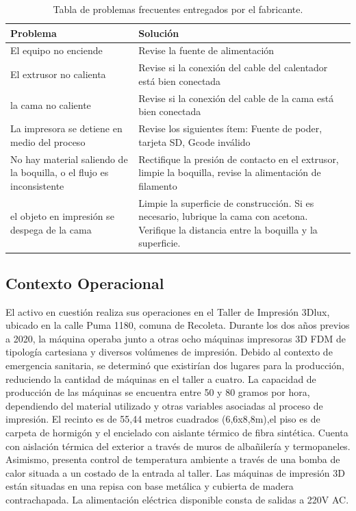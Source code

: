\begin{table}[H]
  \centering
 
    \begin{tabular}{|p{9.215em}|p{19.645em}|}
	\hline    
    Problema & \multicolumn{1}{l}{Solución} \\
	\hline    
    El equipo no enciende & Revise la fuente de alimentación \\
	\hline    
    El extrusor no calienta & Revise si la conexión del cable del calentador está bien conectada \\
	\hline    
    la cama no caliente & Revise si la conexión del cable de la cama está bien conectada \\
	\hline    
    La impresora se detiene en medio del proceso & Revise los siguientes ítem: Fuente de poder, tarjeta SD, Gcode inválido \\
	\hline    
    No hay material saliendo de la boquilla, o el flujo es inconsistente & Rectifique la presión de contacto en el extrusor, limpie la boquilla, revise la alimentación de filamento \\
	\hline    
    el objeto en impresión se despega de la cama & Limpie la superficie de construcción. Si es necesario, lubrique la cama con acetona. Verifique la distancia entre la boquilla y la superficie.  \\
	\hline    
    \end{tabular}%
     \caption{Tabla de problemas frecuentes entregados por el fabricante.}
  \label{tab:addlabel}%
\end{table}%


\subsection{Contexto Operacional}

El activo en cuestión realiza sus operaciones en el Taller de Impresión 3Dlux, ubicado en la calle Puma 1180, comuna de Recoleta. Durante los dos años previos a 2020, la máquina operaba junto a otras ocho máquinas impresoras 3D FDM de tipología cartesiana y diversos volúmenes de impresión. Debido al contexto de emergencia sanitaria, se determinó que existirían dos lugares para la producción, reduciendo la cantidad de máquinas en el taller a cuatro. La capacidad de producción de las máquinas se encuentra entre 50 y 80 gramos por hora, dependiendo del material utilizado y otras variables asociadas al proceso de impresión. El recinto es de 55,44 metros cuadrados (6,6x8,8m),el piso  es de carpeta de hormigón y el encielado con aislante térmico de fibra sintética. Cuenta con aislación térmica del exterior a través de muros de albañilería y termopaneles. Asimismo, presenta control de temperatura ambiente a través de una bomba de calor situada a un costado de la entrada al taller. Las máquinas de impresión 3D están situadas en una repisa con base metálica y cubierta de madera contrachapada. La alimentación eléctrica disponible consta de salidas a 220V AC.

